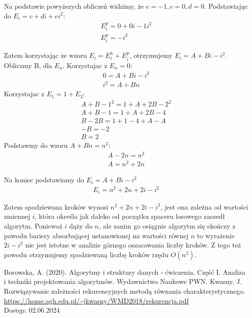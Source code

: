 \documentclass[12pt,oneside,a4paper]{book} %
\theoremstyle{break}
\begin{document}
Na podstawie powyższych obliczeń widzimy, że $e=-1, c=0, d=0$.
Podstawiając do $E_i=c+di+ei^2$:
\begin{align*}
  E_i^p=0+0i-1i^2\\
  E_i^p=-i^2
\end{align*}

Zatem korzystając ze wzoru $E_i=E_i^h+E_i^p$, otrzymujemy $E_i=A+Bi-i^2$.
Obliczmy B, dla $E_n$. Korzystajac z $E_n=0$:
\begin{align*}
  0=A+Bi-i^2\\
  i^2=A+Bn
\end{align*}
Korzystajac z $E_1=1+E_2$:
\begin{align*}
  A+B-1^2=1+A+2B-2^2\\
  A+B-1=1+A+2B-4\\
  B-2B=1+1-4+A-A\\
  -B=-2\\
  B=2
\end{align*}
Podstawmy do wzoru $A+Bn=n^2$:
\begin{align*}
  A-2n=n^2\\
  A=n^2+2n
\end{align*}

Na koniec podstawiamy do $E_i=A+Bi-i^2$
\begin{align*}
  E_i=n^2+2n+2i-i^2
\end{align*}

Zatem spodziewana kroków wynosi $n^2+2n+2i-i^2$, jest ona zależna od wartości zmiennej $i$, która określa jak daleko od początku spaceru losowego zaszedł algorytm. Ponieważ $i$ dąży do $n$, ale zanim go osiągnie algorytm się skończy z powodu bariery absorbującej ustanowionej na wartości równej $n$ to wyrażenie $2i-i^2$ nie jest istotne w analizie górnego oszacowania liczby kroków. Z tego też powodu otrzymujemy spodziewaną liczbę kroków rzędu $O(n^2)$.

\begin{thebibliography}{00}
  Borowska, A. (2020). Algorytmy i struktury danych - ćwiczenia. Część I. Analiza i techniki projektowania algorytmów. Wydawnictwo Naukowe PWN.
  Kwasny, J. Rozwiązywanie zależności rekurencyjnych metodą
  równania charakterystycznego. \url{https://home.agh.edu.pl/~jkwasny/WMD2018/rekurencja.pdf}\\
  Dostęp: 02.06.2024
\end{thebibliography}
\end{document}
